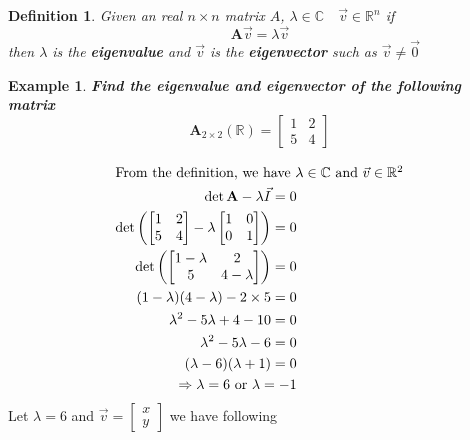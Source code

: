 \documentclass{article}
\newtheorem{definition}{Definition}
\newtheorem{example}{Example}
\begin{document}
%
\begin{definition}
Given an real  $n \times n$ matrix $A$, $\lambda \in \mathbb{C} \quad  \vec{v} \in \mathbb{R}^{n}$ if 
      \[ \mathbf{A} \vec{v} = \lambda \vec{v} \]   
then $\lambda$ is the \textbf{eigenvalue} and $\vec{v}$ is the \textbf{eigenvector} such as $\vec{v} \ne \vec{0}$ 
\end{definition}
%
\begin{example}
\textbf{Find the eigenvalue and eigenvector of the following matrix}
\[  \mathbf{A}_{2\times2}(\mathbb{R})= 
    \begin{bmatrix}
    1 & 2\\
    5 & 4
    \end{bmatrix}  \]
\end{example}
\begin{align*}
\intertext{From the definition, we have $\lambda \in \mathbb{C}$ and $\vec{v} \in \mathbb{R}^{2}$}
    \det \mathbf{A} - \lambda \vec{I} = 0  \\
    \det\left(\begin{bmatrix}
    1 & 2\\
    5 & 4
    \end{bmatrix} - \lambda 
    \begin{bmatrix}
    1 & 0\\
    0 & 1
    \end{bmatrix} \right)  = 0  \\
    \det\left(\begin{bmatrix}
    1 - \lambda & 2\\
    5 & 4 - \lambda
    \end{bmatrix} \right)= 0 \\
    (1-\lambda)(4-\lambda)-2 \times 5  = 0 \\
    \lambda^2 - 5\lambda + 4 - 10  = 0 \\
    \lambda^2 - 5\lambda - 6  = 0 \\
    (\lambda -6) (\lambda + 1) = 0 \\ 
    \Rightarrow \lambda = 6 \mbox{ or }  \lambda = -1 
\end{align*}
Let $\lambda = 6$ and 
$\vec{v} =\left[ \begin{array}{c} 
        x \\
        y 
        \end{array} 
        \right] $ 
we have following
\end{document}
